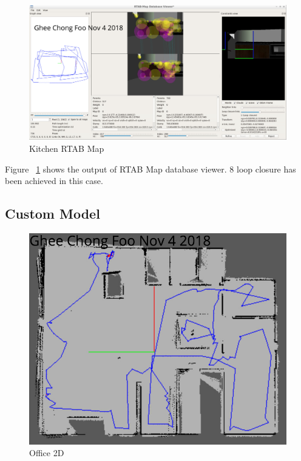 \documentclass[10pt,journal,compsoc]{IEEEtran}
\begin{document}
\begin{figure}[thpb]
      \centering
      \includegraphics[width=\linewidth]{Kitchen_World_RTAB_Map.png}
      \caption{Kitchen RTAB Map}
      \label{fig:kitchen_rtabmap}
\end{figure}

Figure ~\ref{fig:kitchen_rtabmap} shows the output of RTAB Map database viewer.  8 loop closure has been achieved in this case.

\subsection{Custom Model}


\begin{figure}[thpb]
      \centering
      \includegraphics[width=\linewidth]{Office_2D.png}
      \caption{Office 2D}
      \label{fig:office_2d}
\end{figure}
\end{document}
